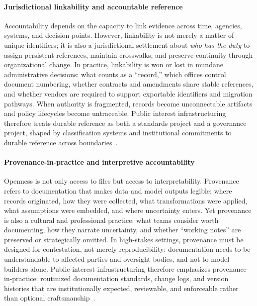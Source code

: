 \documentclass[acmsmall,screen]{acmart}
\begin{document}
\paragraph*{Jurisdictional linkability and accountable reference}
Accountability depends on the capacity to link evidence across time, agencies, systems, and decision points. However, linkability is not merely a matter of unique identifiers; it is also a jurisdictional settlement about \emph{who has the duty} to assign persistent references, maintain crosswalks, and preserve continuity through organizational change. In practice, linkability is won or lost in mundane administrative decisions: what counts as a ``record,'' which offices control document numbering, whether contracts and amendments share stable references, and whether vendors are required to support exportable identifiers and migration pathways. When authority is fragmented, records become unconnectable artifacts and policy lifecycles become untraceable. Public interest infrastructuring therefore treats durable reference as both a standards project and a governance project, shaped by classification systems and institutional commitments to durable reference across boundaries~\cite{bowker_sorting_2000,khatri_governance_2010}.

\paragraph*{Provenance-in-practice and interpretive accountability}
Openness is not only access to files but access to interpretability. Provenance refers to documentation that makes data and model outputs legible: where records originated, how they were collected, what transformations were applied, what assumptions were embedded, and where uncertainty enters. Yet provenance is also a cultural and professional practice: what teams consider worth documenting, how they narrate uncertainty, and whether ``working notes'' are preserved or strategically omitted. In high-stakes settings, provenance must be designed for contestation, not merely reproducibility: documentation needs to be understandable to affected parties and oversight bodies, and not to model builders alone. Public interest infrastructuring therefore emphasizes provenance-in-practice: routinized documentation standards, change logs, and version histories that are institutionally expected, reviewable, and enforceable rather than optional craftsmanship~\cite{thomerRelationalDataParadigms2020,passiTrustDataScience2018a,acker_DataCraftTheory_2019}.
\end{document}
